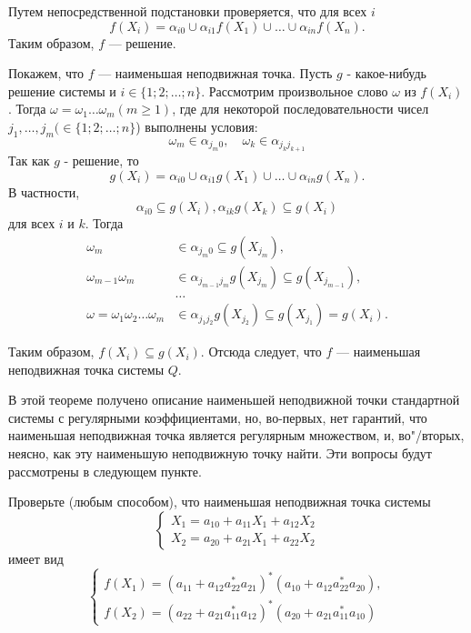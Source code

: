 \begin{myproof}
Путем непосредственной подстановки проверяется, что для всех $i$
\[
f(X_{i}) = \alpha_{i0} \cup \alpha_{i1}f(X_1) \cup \dots \cup \alpha_{in}f(X_n).
\]
Таким образом, $f$ --- решение.

Покажем, что $f$ --- наименьшая неподвижная точка. Пусть $g$ - какое-нибудь решение системы и $i\in\{1;2;\ldots ;n\}$. Рассмотрим произвольное слово $\omega$ из $f(X_i)$. Тогда $\omega=\omega_1\ldots\omega_m (m\ge 1)$, где для некоторой последовательности чисел $j_1, \ldots , j_m (\in\{1;2;\ldots ;n\}$) выполнены условия:
\[
	\omega_m\in\alpha_{j_m0}, \quad \omega_k\in\alpha_{j_kj_{k+1}}
\]
Так как $g$ - решение, то
\[
	g(X_i) = \alpha_{i0} \cup \alpha_{i1}g(X_{1}) \cup \dots  \cup \alpha_{in}g(X_n).
\]
В частности,
\[
	\alpha_{i0} \subseteq g(X_i), 	\alpha_{ik}g(X_k) \subseteq g(X_i)
\]
для всех $i$ и $k$. Тогда
\begin{align*}
    \omega_m & \in \alpha_{j_m0} \subseteq g(X_{j_m}),\\
    \omega_{m-1}\omega_m & \in \alpha_{j_{m-1}j_m}g(X_{j_m})
        \subseteq g(X_{j_{m-1}}),\\
    &\ldots \\
    \omega=\omega_1\omega_2\ldots\omega_m & \in
        \alpha_{j_1j_2}g(X_{j_2}) \subseteq g(X_{j_1})=g(X_i).
\end{align*}

Таким образом, $f(X_i)\subseteq g(X_i)$. Отсюда следует, что $f$ --- наименьшая неподвижная точка системы $Q$.
\end{myproof}

В этой теореме получено описание наименьшей неподвижной точки стандартной системы с регулярными коэффициентами, но, во-первых, нет гарантий, что наименьшая неподвижная точка является регулярным множеством, и, во"/вторых, неясно, как эту наименьшую неподвижную точку найти. Эти вопросы будут рассмотрены в следующем пункте.

\begin{myproblem}
Проверьте (любым способом), что наименьшая неподвижная точка системы
\begin{equation}
\begin{cases}
X_1 = a_{10} + a_{11}X_1 + a_{12}X_2\\
X_2 = a_{20} + a_{21}X_1 + a_{22}X_2
\end{cases}
\end{equation}
имеет вид
\begin{equation}
\begin{cases}
f(X_1) = (a_{11}+a_{12}a^*_{22}a_{21})^*(a_{10}+a_{12}a^*_{22}a_{20}), \\
f(X_2) = (a_{22}+a_{21}a^*_{11}a_{12})^*(a_{20}+a_{21}a^*_{11}a_{10})
\end{cases}
\end{equation}
\end{myproblem}


